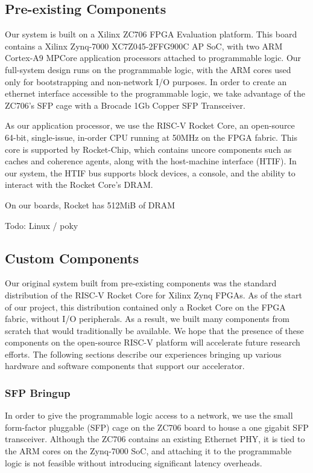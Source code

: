 \subsection{Pre-existing Components}
    Our system is built on a Xilinx ZC706 FPGA Evaluation platform. This board
    contains a Xilinx Zynq-7000 XC7Z045-2FFG900C AP SoC, with two ARM Cortex-A9
    MPCore application processors attached to programmable logic. Our full-system
    design runs on the programmable logic, with the ARM cores used only for 
    bootstrapping and non-network I/O purposes. In order to create an ethernet interface accessible
    to the programmable logic, we take advantage of the ZC706's SFP cage with a 
    Brocade 1Gb Copper SFP Transceiver.


    As our application processor, we use the RISC-V Rocket Core, an open-source
    64-bit, single-issue, in-order CPU running at 50MHz on the FPGA fabric. This 
    core is supported by Rocket-Chip, which contains uncore components such as
    caches and coherence agents, along with the host-machine interface (HTIF).
    In our system, the HTIF bus supports block devices, a console, and the ability
    to interact with the Rocket Core's DRAM.

    On our boards, Rocket has 512MiB of DRAM

Todo: Linux / poky



\subsection{Custom Components}
    Our original system built from pre-existing components was the standard
    distribution of the RISC-V Rocket Core for Xilinx Zynq FPGAs. As of the 
    start of our project, this distribution contained only a Rocket Core on
    the FPGA fabric, without I/O peripherals. As a result, we built many 
    components from scratch that would traditionally be available. We hope that
    the presence of these components on the open-source RISC-V platform
    will accelerate future research efforts. The following sections describe our
    experiences bringing up various hardware and software components that support
    our accelerator.

\subsubsection {SFP Bringup}
    In order to give the programmable logic access to a network, we use 
    the small form-factor pluggable (SFP) cage on the ZC706 board to house a 
    one gigabit SFP transceiver. Although the ZC706 contains an existing Ethernet
    PHY, it is tied to the ARM cores on the Zynq-7000 SoC, and attaching it to 
    the programmable logic is not feasible without introducing significant 
    latency overheads.


